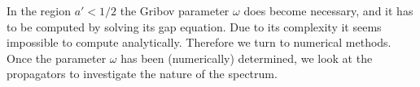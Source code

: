In the region $a'<1/2$ the Gribov parameter $\omega$ does become necessary, and it has to be computed by solving its gap equation. Due to its complexity it seems impossible to compute analytically. Therefore we turn to numerical methods. 
Once the parameter $\omega$ has been (numerically) determined, we look at the propagators to investigate the nature of the spectrum.



